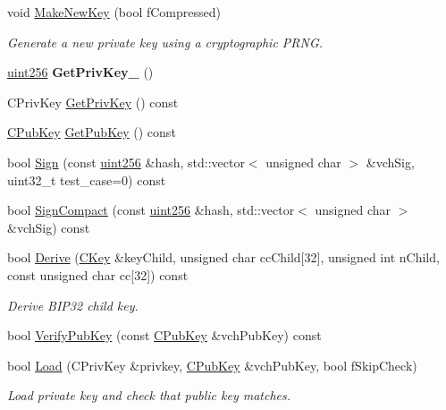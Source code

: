 \begin{DoxyCompactItemize}
void \mbox{\hyperlink{class_c_key_a9d12ed9d297e4286250fd7ea6b59e1a5}{Make\+New\+Key}} (bool f\+Compressed)
\begin{DoxyCompactList}\small\item\em Generate a new private key using a cryptographic P\+R\+NG. \end{DoxyCompactList}\item 
\mbox{\label{class_c_key_a2984be4b20b4873c440e846d8e5594e0}} 
\mbox{\hyperlink{classuint256}{uint256}} {\bfseries Get\+Priv\+Key\+\_} ()
\item 
C\+Priv\+Key \mbox{\hyperlink{class_c_key_a91b6ecf71cc16e0b05ce79ec9276e729}{Get\+Priv\+Key}} () const
\item 
\mbox{\hyperlink{class_c_pub_key}{C\+Pub\+Key}} \mbox{\hyperlink{class_c_key_aa1085c59603a62db6ec776300f250337}{Get\+Pub\+Key}} () const
\item 
bool \mbox{\hyperlink{class_c_key_aa9b184a4a71d3e1a40aab360cf68e86c}{Sign}} (const \mbox{\hyperlink{classuint256}{uint256}} \&hash, std\+::vector$<$ unsigned char $>$ \&vch\+Sig, uint32\+\_\+t test\+\_\+case=0) const
\item 
bool \mbox{\hyperlink{class_c_key_afe77d80889aa68e92e6882e75424cfb8}{Sign\+Compact}} (const \mbox{\hyperlink{classuint256}{uint256}} \&hash, std\+::vector$<$ unsigned char $>$ \&vch\+Sig) const
\item 
\mbox{\label{class_c_key_a5166e6f49c17c3ad47ac0fa89305307b}} 
bool \mbox{\hyperlink{class_c_key_a5166e6f49c17c3ad47ac0fa89305307b}{Derive}} (\mbox{\hyperlink{class_c_key}{C\+Key}} \&key\+Child, unsigned char cc\+Child\mbox{[}32\mbox{]}, unsigned int n\+Child, const unsigned char cc\mbox{[}32\mbox{]}) const
\begin{DoxyCompactList}\small\item\em Derive B\+I\+P32 child key. \end{DoxyCompactList}\item 
bool \mbox{\hyperlink{class_c_key_ac53425b8d0f89067bce781c485101b20}{Verify\+Pub\+Key}} (const \mbox{\hyperlink{class_c_pub_key}{C\+Pub\+Key}} \&vch\+Pub\+Key) const
\item 
\mbox{\label{class_c_key_a141751588f8bfe5f1b6fc27f4e64b63f}} 
bool \mbox{\hyperlink{class_c_key_a141751588f8bfe5f1b6fc27f4e64b63f}{Load}} (C\+Priv\+Key \&privkey, \mbox{\hyperlink{class_c_pub_key}{C\+Pub\+Key}} \&vch\+Pub\+Key, bool f\+Skip\+Check)
\begin{DoxyCompactList}\small\item\em Load private key and check that public key matches. \end{DoxyCompactList}\end{DoxyCompactItemize}
